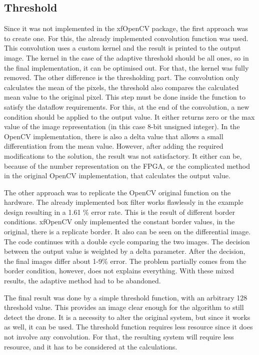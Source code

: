 \subsection{Threshold} %
Since it was not implemented in the xfOpenCV package, the first approach was to create one.
For this, the already implemented convolution function was used.
This convolution uses a custom kernel and the result is printed to the output image.
The kernel in the case of the adaptive threshold should be all ones, so in the final implementation, it can be optimised out.
For that, the kernel was fully removed.
The other difference is the thresholding part.
The convolution only calculates the mean of the pixels, the threshold also compares the calculated mean value to the original pixel.
This step must be done inside the function to satisfy the dataflow requirements.
For this, at the end of the convolution, a new condition should be applied to the output value.
It either returns zero or the max value of the image representation (in this case 8-bit unsigned integer).
In the OpenCV implementation, there is also a delta value that allows a small differentiation from the mean value.
However, after adding the required modifications to the solution, the result was not satisfactory.
It either can be, because of the number representation on the FPGA, or the complicated method in the original OpenCV implementation, that calculates the output value.

The other approach was to replicate the OpenCV original function on the hardware.
The already implemented box filter works flawlessly in the example design resulting in a 1.61 \% error rate.
This is the result of different border conditions.
xfOpenCV only implemented the constant border values, in the original, there is a replicate border.
It also can be seen on the differential image.
The code continues with a double cycle comparing the two images.
The decision between the output value is weighted by a delta parameter.
After the decision, the final images differ about 1-9\% error.
The problem partially comes from the border condition, however, does not explains everything.
With these mixed results, the adaptive method had to be abandoned.

The final result was done by a simple threshold function, with an arbitrary 128 threshold value.
This provides an image clear enough for the algorithm to still detect the drone.
It is a necessity to alter the original system, but since it works as well, it can be used.
The threshold function requires less resource since it does not involve any convolution.
For that, the resulting system will require less resource, and it has to be considered at the calculations.


